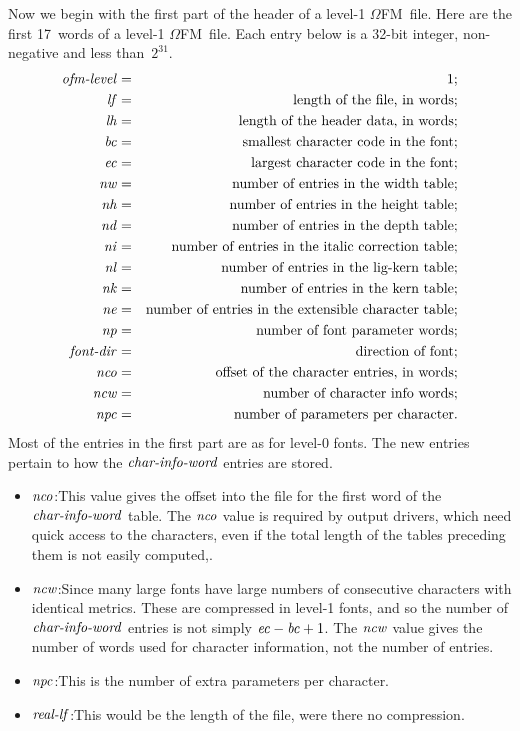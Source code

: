 \documentclass[fleqn]{article}
\newcommand{\OMEGA}{$\Omega$}
\newcommand{\myit}[1]{\mbox{\emph{#1}}}
\newcommand{\OFM}{\OMEGA FM}
\begin{document}
Now we begin with the first part of the header of a level-1 \OFM\ file.
Here are the first 17~words of a level-1 \OFM\ file.
Each entry below is a 32-bit integer, non-negative and less
than~$2^{31}$.
\begin{eqnarray*}
\myit{ofm-level} & = & 1; \\
\myit{lf} & = & \mbox{length of the file, in words}; \\
\myit{lh} & = & \mbox{length of the header data, in words}; \\
\myit{bc} & = & \mbox{smallest character code in the font}; \\
\myit{ec} & = & \mbox{largest character code in the font}; \\
\myit{nw} & = & \mbox{number of entries in the width table}; \\
\myit{nh} & = & \mbox{number of entries in the height table}; \\
\myit{nd} & = & \mbox{number of entries in the depth table}; \\
\myit{ni} & = & \mbox{number of entries in the italic correction table}; \\
\myit{nl} & = & \mbox{number of entries in the lig-kern table}; \\
\myit{nk} & = & \mbox{number of entries in the kern table}; \\
\myit{ne} & = & \mbox{number of entries in the extensible character table}; \\
\myit{np} & = & \mbox{number of font parameter words}; \\
\myit{font-dir} & = & \mbox{direction of font}; \\
\myit{nco} & = & \mbox{offset of the character entries, in words}; \\
\myit{ncw} & = & \mbox{number of character info words}; \\
\myit{npc} & = & \mbox{number of parameters per character}.
\end{eqnarray*}
Most of the entries in the first part are as for level-0 fonts.  The new
entries pertain to how the $\myit{char-info-word}$ entries are stored.
\begin{itemize}
\item $\myit{nco}$:\quad This value gives the offset into the file
for the first word of the $\myit{char-info-word}$ table.  The
$\myit{nco}$ value is required by output drivers, which need quick
access to the characters, even if the total length
of the tables preceding them is not easily computed,.
\item $\myit{ncw}$:\quad Since many large fonts have large numbers
of consecutive characters with identical metrics.  These are compressed
in level-1 fonts, and so the number of $\myit{char-info-word}$
entries is not simply $\myit{ec}-\myit{bc}+1$.  The $\myit{ncw}$
value gives the number of words used for character information,
not the number of entries.
\item $\myit{npc}$:\quad This is the number of extra parameters per character.
\item $\myit{real-lf}$:\quad This would be the length of
the file, were there no compression.
\end{itemize}
\end{document}
